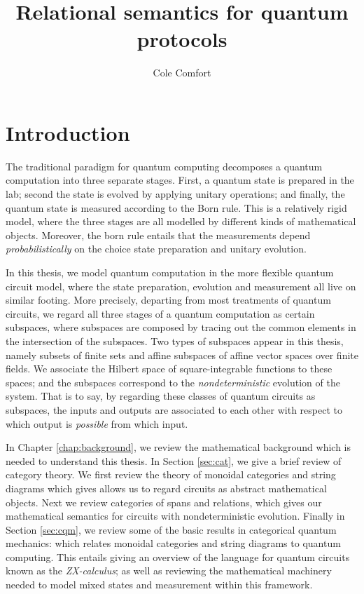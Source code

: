 \documentclass[12pt]{ociamthesis}  %
\title{Relational semantics for quantum protocols}
\author{Cole Comfort}
\begin{document}
\maketitle

\tableofcontents


\chapter{Introduction}
\label{chap:intro}


The traditional paradigm for quantum computing decomposes a quantum computation into three separate stages. First, a quantum state is prepared in the lab; second the state is evolved by applying unitary operations; and finally, the quantum state is measured according to the Born rule.  This is a relatively rigid model, where the three stages are all modelled by different kinds of mathematical objects.  Moreover, the born rule entails that the measurements depend {\em probabilistically} on the choice state preparation and unitary evolution.

In this thesis, we model quantum computation in the more flexible quantum circuit model, where the state preparation, evolution and measurement all live on similar footing.  More precisely, departing from most treatments of quantum circuits, we regard all three stages of a quantum computation as certain subspaces, where subspaces are composed by tracing out the common elements in the intersection of the subspaces.  Two types of subspaces appear in this thesis, namely subsets of finite sets and affine subspaces of affine vector spaces over finite fields.  We associate the Hilbert space of square-integrable functions to these spaces; and the subspaces correspond to the {\em nondeterministic} evolution of the system.  That is to say, by regarding these classes of quantum circuits as subspaces, the inputs and outputs are associated to each other with respect to which output is {\em possible} from which input.

In Chapter \ref{chap:background}, we review the mathematical background which is needed to understand this thesis.  In Section \ref{sec:cat}, we give a brief review of category theory.  We first review the theory of monoidal categories and string diagrams which gives allows us to regard circuits as abstract mathematical objects.  Next we review categories of spans and relations, which gives our mathematical semantics for circuits with nondeterministic evolution.  Finally in Section \ref{sec:cqm}, we review some of the basic results in categorical quantum mechanics: which relates monoidal categories and string diagrams to quantum computing. This entails giving an overview of the language for quantum circuits known as the {\em ZX-calculus}; as well as reviewing the mathematical machinery needed to model mixed states and measurement within this framework.
\end{document}
